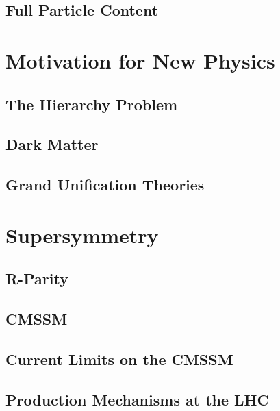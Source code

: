 \subsection{Full Particle Content} 


\section{Motivation for New Physics}
	
\subsection{The Hierarchy Problem}
\subsection{Dark Matter}
\subsection{Grand Unification Theories}

\section{Supersymmetry}

\subsection{R-Parity}
\subsection{CMSSM}
\subsection{Current Limits on the CMSSM}
\subsection{Production Mechanisms at the LHC}



